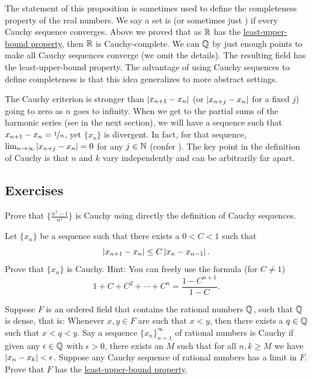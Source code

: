 \begin{remark}
The statement of this proposition is sometimes used to define the
completeness property of the real numbers.  We say a set is
\emph{} (or sometimes just \emph{})
if every Cauchy sequence converges.
Above we proved that
as ${\mathbb{R}}$ has the \hyperref[defn:lub]{least-upper-bound property}, then ${\mathbb{R}}$ is 
Cauchy-complete.
We can  ${\mathbb{Q}}$ by  just enough points to make all
Cauchy sequences converge (we omit the details).
The resulting field has the
least-upper-bound property.
The advantage of using Cauchy
sequences to define completeness is that this idea generalizes to
more abstract settings.
\end{remark}

The Cauchy criterion is stronger than 
$\left\lvert {x_{n+1}-x_n} \right\rvert$ (or $\left\lvert {x_{n+j}-x_n} \right\rvert$ for a fixed $j$) going to zero as
$n$ goes to
infinity.  When we get to the partial sums of the harmonic series
(see  in the next section), we will have
a sequence such that $x_{n+1}-x_n = \nicefrac{1}{n}$, yet $\{ x_n \}$ is
divergent.  In fact, for that sequence,
$\lim_{n\to\infty} \left\lvert {x_{n+j}-x_n} \right\rvert = 0$ for
any $j \in {\mathbb{N}}$ (confer ).
The key point in the definition of Cauchy is that $n$ and $k$
vary independently and can be arbitrarily far apart.

\subsection{Exercises}

\begin{exercise}
Prove that $\{ \frac{n^2-1}{n^2} \}$ is Cauchy using directly the definition
of Cauchy sequences.
\end{exercise}

\begin{exercise}
Let $\{ x_n \}$ be a sequence such that
there exists a $0 < C < 1$ such that
\begin{equation*}
\left\lvert {x_{n+1} - x_n} \right\rvert \leq C \left\lvert {x_{n}-x_{n-1}} \right\rvert .
\end{equation*}
Prove that $\{ x_n \}$ is Cauchy.
Hint:  You can freely use the formula (for $C \not= 1$)
\begin{equation*}
1+ C+ C^2 + \cdots + C^n = \frac{1-C^{n+1}}{1-C}.
\end{equation*}
\end{exercise}

\begin{exercise}[Challenging]
Suppose $F$ is an ordered field that contains the rational numbers
${\mathbb{Q}}$, such that ${\mathbb{Q}}$ is dense,
that is: Whenever $x,y \in F$ are such that $x < y$,
then there exists a $q \in {\mathbb{Q}}$ such that $x < q < y$.
Say a sequence $\{ x_n \}_{n=1}^\infty$ of rational numbers is Cauchy
if given any $\epsilon \in {\mathbb{Q}}$ with $\epsilon > 0$, there exists
an $M$ such that for all $n,k \geq M$ we have $\left\lvert {x_n-x_k} \right\rvert < \epsilon$.
Suppose any Cauchy sequence of rational numbers has a limit in $F$.
Prove that $F$ has the \hyperref[defn:lub]{least-upper-bound property}.
\end{exercise}

